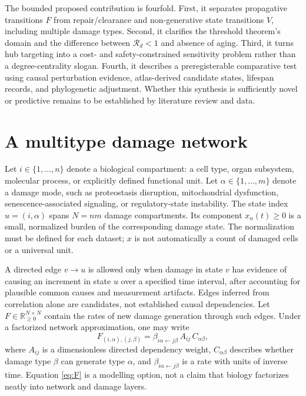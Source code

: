 \documentclass[11pt,a4paper]{article}
\newcommand{\Rd}{\mathcal{R}_{d}}
\newcommand{\RR}{\mathbb{R}}
\begin{document}
The bounded proposed contribution is fourfold. First, it separates propagative transitions $F$ from repair/clearance and non-generative state transitions $V$, including multiple damage types. Second, it clarifies the threshold theorem's domain and the difference between $\Rd<1$ and absence of aging. Third, it turns hub targeting into a cost- and safety-constrained sensitivity problem rather than a degree-centrality slogan. Fourth, it describes a preregisterable comparative test using causal perturbation evidence, atlas-derived candidate states, lifespan records, and phylogenetic adjustment. Whether this synthesis is sufficiently novel or predictive remains to be established by literature review and data.

\section{A multitype damage network}
Let $i\in\{1,\ldots,n\}$ denote a biological compartment: a cell type, organ subsystem, molecular process, or explicitly defined functional unit. Let $\alpha\in\{1,\ldots,m\}$ denote a damage mode, such as proteostasis disruption, mitochondrial dysfunction, senescence-associated signaling, or regulatory-state instability. The state index $u=(i,\alpha)$ spans $N=nm$ damage compartments. Its component $x_u(t)\geq 0$ is a small, normalized burden of the corresponding damage state. The normalization must be defined for each dataset; $x$ is not automatically a count of damaged cells or a universal unit.

A directed edge $v\rightarrow u$ is allowed only when damage in state $v$ has evidence of causing an increment in state $u$ over a specified time interval, after accounting for plausible common causes and measurement artifacts. Edges inferred from correlation alone are candidates, not established causal dependencies. Let $F\in\RR^{N\times N}_{\geq 0}$ contain the rates of new damage generation through such edges. Under a factorized network approximation, one may write
\begin{equation}
F_{(i,\alpha),(j,\beta)} = \beta_{i\alpha\leftarrow j\beta}\, A_{ij}\,C_{\alpha\beta},
\label{eq:F}
\end{equation}
where $A_{ij}$ is a dimensionless directed dependency weight, $C_{\alpha\beta}$ describes whether damage type $\beta$ can generate type $\alpha$, and $\beta_{i\alpha\leftarrow j\beta}$ is a rate with units of inverse time. Equation \eqref{eq:F} is a modelling option, not a claim that biology factorizes neatly into network and damage layers.
\end{document}
